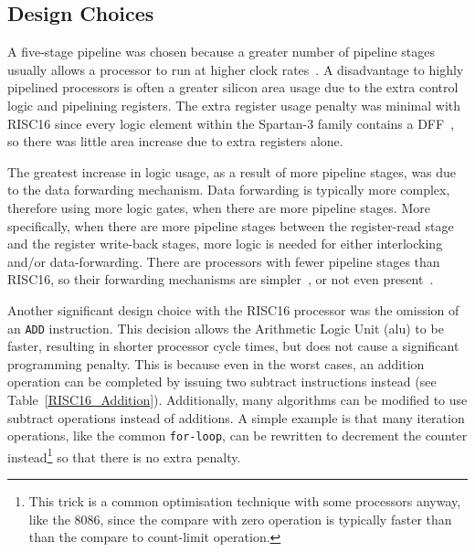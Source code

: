 \subsection{Design Choices}
A five-stage pipeline was chosen because a greater number of pipeline stages
usually allows a processor to run at higher clock rates~\cite{Comp_Arch,
parhami2005cam}. A disadvantage to highly pipelined processors is often a greater
silicon area usage due to the extra control logic and pipelining registers. The
extra register usage penalty was minimal with RISC16 since every logic element
within the Spartan-3 family contains a DFF~\cite{Xilinx_SP3_DS}, so there was
little area increase due to extra registers alone.

The greatest increase in logic usage, as a result of more pipeline stages, was
due to the data forwarding mechanism. Data forwarding is typically more complex,
therefore using more logic gates, when there are more pipeline stages. More
specifically, when there are more pipeline stages between the register-read stage
and the register write-back stages, more logic is needed for either interlocking
and/or data-forwarding. There are processors with fewer pipeline stages than
RISC16, so their forwarding mechanisms are simpler~\cite{ARM_Book}, or not even
present~\cite{FPGACPU}.

Another significant design choice with the RISC16 processor was the omission of
an \texttt{ADD} instruction. This decision allows the Arithmetic Logic
Unit (\gls{alu}) to be
faster, resulting in shorter processor cycle times, but does not cause a
significant programming penalty. This is because even in the worst cases, an
addition operation can be completed by issuing two subtract instructions instead
(see Table~\ref{RISC16_Addition}). Additionally, many algorithms can be modified
to use subtract operations instead of additions. A simple example is that many
iteration operations, like the common \texttt{for-loop}, can be rewritten to
decrement the counter instead\footnote{This trick is a common optimisation
technique with some processors anyway, like the 8086, since the compare with zero
operation is typically faster than than the compare to count-limit operation.} so
that there is no extra penalty.

